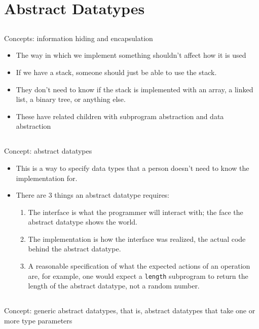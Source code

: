 \section{Abstract Datatypes}\label{sec:Abstract_Datatypes}

\subsection{}
Concepts: information hiding and encapsulation

\begin{itemize}[noitemsep]
\item The way in which we implement something shouldn't affect how it is used
\item If we have a stack, someone should just be able to use the stack.
\item They don't need to know if the stack is implemented with an array, a linked list, a binary tree, or anything else.
\item These have related children with subprogram abstraction and data abstraction
\end{itemize}

\subsection{}
Concept: abstract datatypes

\begin{itemize}[noitemsep]
\item This is a way to specify data types that a person doesn't need to know the implementation for.
\item There are 3 things an abstract datatype requires:
  \begin{enumerate}[noitemsep]
    \item The interface is what the programmer will interact with; the face the abstract datatype shows the world.
    \item The implementation is how the interface was realized, the actual code behind the abstract datatype.
    \item A reasonable specification of what the expected actions of an operation are, for example, one would expect a \texttt{length} subprogram to return the length of the abstract datatype, not a random number.
  \end{enumerate}
\end{itemize}

\subsection{}
Concept: generic abstract datatypes, that is, abstract datatypes that take one or more type parameters

